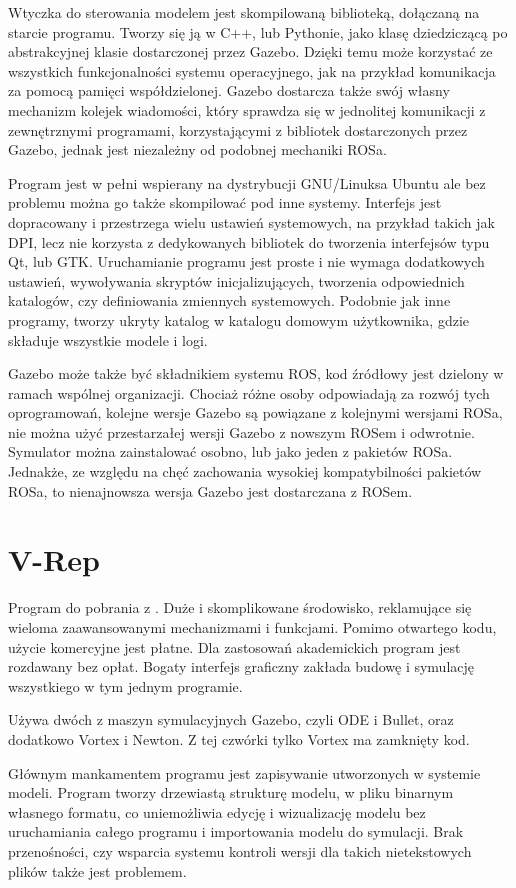 	Wtyczka do sterowania modelem jest skompilowaną biblioteką, dołączaną na starcie programu.
	Tworzy się ją w C++, lub Pythonie, jako klasę dziedziczącą po abstrakcyjnej klasie dostarczonej przez Gazebo.
	Dzięki temu może korzystać ze wszystkich funkcjonalności systemu operacyjnego, jak na przykład komunikacja za pomocą pamięci współdzielonej.
	Gazebo dostarcza także swój własny mechanizm kolejek wiadomości, który sprawdza się w jednolitej komunikacji z zewnętrznymi programami, korzystającymi z bibliotek 
	dostarczonych przez Gazebo, jednak jest niezależny od podobnej mechaniki ROSa.

	Program jest w pełni wspierany na dystrybucji GNU/Linuksa Ubuntu ale bez problemu można go także skompilować pod inne systemy.
	Interfejs jest dopracowany i przestrzega wielu ustawień systemowych, na przykład takich jak DPI, lecz nie korzysta z dedykowanych bibliotek do tworzenia 
	interfejsów typu Qt, lub GTK.
	Uruchamianie programu jest proste i nie wymaga dodatkowych ustawień, wywoływania skryptów inicjalizujących, 
	tworzenia odpowiednich katalogów, czy definiowania zmiennych systemowych.
	Podobnie jak inne programy, tworzy ukryty katalog w katalogu domowym użytkownika, gdzie składuje wszystkie modele i logi.

	Gazebo może także być składnikiem systemu ROS, kod źródłowy jest dzielony w ramach wspólnej organizacji.
	Chociaż różne osoby odpowiadają za rozwój tych oprogramowań,
	kolejne wersje Gazebo są powiązane z kolejnymi wersjami ROSa, nie można użyć przestarzałej wersji Gazebo z nowszym ROSem i odwrotnie.
	Symulator można zainstalować osobno, lub jako jeden z pakietów ROSa.
	Jednakże, ze względu na chęć zachowania wysokiej kompatybilności pakietów ROSa, to nienajnowsza wersja Gazebo jest dostarczana z ROSem.

\section{V-Rep}
	Program do pobrania z \cite{vrep_website}. Duże i skomplikowane środowisko, reklamujące się wieloma zaawansowanymi mechanizmami i funkcjami.
	Pomimo otwartego kodu, użycie komercyjne jest płatne. Dla zastosowań akademickich program jest rozdawany bez opłat.
	Bogaty interfejs graficzny zakłada budowę i symulację wszystkiego w tym jednym programie.

	Używa dwóch z maszyn symulacyjnych Gazebo, czyli ODE i Bullet, oraz dodatkowo Vortex i Newton. Z tej czwórki tylko Vortex ma zamknięty kod.

	Głównym mankamentem programu jest zapisywanie utworzonych w systemie modeli.
	Program tworzy drzewiastą strukturę modelu, w pliku binarnym własnego formatu, co uniemożliwia edycję i wizualizację modelu bez uruchamiania całego programu 
	i importowania modelu do symulacji.
	Brak przenośności, czy wsparcia systemu kontroli wersji dla takich nietekstowych plików także jest problemem.

